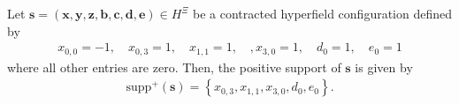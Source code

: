 \begin{example}
    Let \( \mathbf{s} = (\mathbf{x}, \mathbf{y}, \mathbf{z}, \mathbf{b}, \mathbf{c}, \mathbf{d}, \mathbf{e}) \in H^{\Xi}\) be a contracted hyperfield configuration defined by 
    \begin{align*}
        x_{0,0} = -1, \quad x_{0,3} = 1, \quad x_{1,1} = 1, \quad, x_{3,0} = 1, \quad d_0 = 1, \quad e_0 = 1
    \end{align*}
    where all other entries are zero. Then, the positive support of \( \mathbf{s} \) is given by
    \begin{align*}
        \mathrm{supp}^+(\mathbf{s}) = \left\{ x_{0,3}, x_{1,1}, x_{3,0}, d_0, e_0 \right\}.
    \end{align*}
\end{example}
